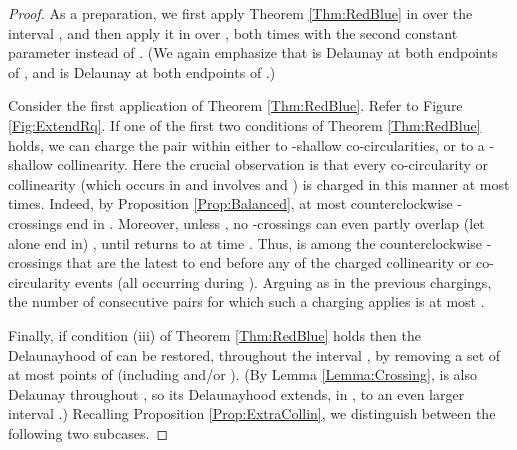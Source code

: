 \documentclass[letter,11pt]{article}
\begin{document}
\begin{proof}
As a preparation,
we first apply Theorem \ref{Thm:RedBlue} in  over the interval , and then apply it in  over , both times with the second constant parameter  instead of . (We again emphasize that  is Delaunay at both endpoints of , and  is Delaunay at both endpoints of .)

\smallskip
{}
Consider the first application of Theorem \ref{Thm:RedBlue}. Refer to Figure \ref{Fig:ExtendRq}.
If one of the first two conditions of Theorem \ref{Thm:RedBlue} holds, we can charge the pair  within  either to 
-shallow co-circularities, or to a -shallow collinearity. Here the crucial observation is that every co-circularity or collinearity (which occurs in  and involves  and ) is charged in this manner at most  times. Indeed, by Proposition \ref{Prop:Balanced},
at most  counterclockwise -crossings end in . Moreover, unless , no -crossings can even partly overlap (let alone end in) , until  returns to  at time .
Thus,  is among the  counterclockwise -crossings that are the latest to end before any of the charged collinearity or co-circularity events (all occurring during ). 
Arguing as in the previous chargings, the number of consecutive pairs  for which such a charging applies is at most .

Finally, if condition (iii) of Theorem \ref{Thm:RedBlue} holds then the Delaunayhood of  can be restored, throughout the interval , by removing a set  of at most  points of  (including  and/or ). (By Lemma \ref{Lemma:Crossing},  is also Delaunay throughout , so its Delaunayhood extends, in , to an even larger interval .)
Recalling Proposition \ref{Prop:ExtraCollin}, we distinguish between the following two subcases.


\end{proof}
\end{document}
